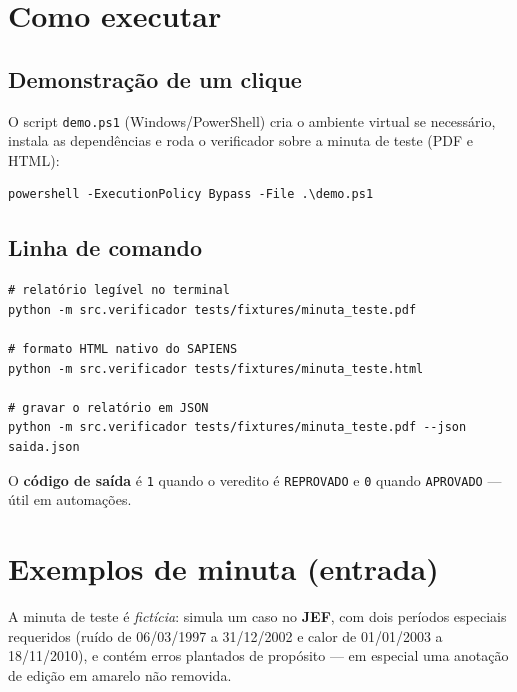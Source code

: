 \documentclass[11pt,a4paper]{article}
\newcommand{\status}[1]{\texttt{#1}}
\begin{document}
\section{Como executar}

\subsection{Demonstração de um clique}
O script \texttt{demo.ps1} (Windows/PowerShell) cria o ambiente virtual se
necessário, instala as dependências e roda o verificador sobre a minuta de teste
(PDF e HTML):

\begin{lstlisting}[style=terminal]
powershell -ExecutionPolicy Bypass -File .\demo.ps1
\end{lstlisting}

\subsection{Linha de comando}
\begin{lstlisting}[style=terminal]
# relatório legível no terminal
python -m src.verificador tests/fixtures/minuta_teste.pdf

# formato HTML nativo do SAPIENS
python -m src.verificador tests/fixtures/minuta_teste.html

# gravar o relatório em JSON
python -m src.verificador tests/fixtures/minuta_teste.pdf --json saida.json
\end{lstlisting}

\noindent O \textbf{código de saída} é \texttt{1} quando o veredito é
\status{REPROVADO} e \texttt{0} quando \status{APROVADO} --- útil em automações.

\section{Exemplos de minuta (entrada)}

A minuta de teste é \emph{fictícia}: simula um caso no \textbf{JEF}, com dois
períodos especiais requeridos (ruído de 06/03/1997 a 31/12/2002 e calor de
01/01/2003 a 18/11/2010), e contém erros plantados de propósito --- em especial
uma anotação de edição em amarelo não removida.
\end{document}
